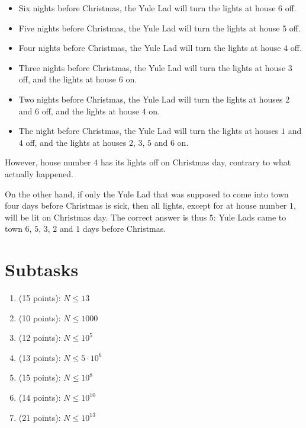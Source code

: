 \begin{itemize}
    \item Six nights before Christmas, the Yule Lad will turn the lights at house $6$ off.
    \item Five nights before Christmas, the Yule Lad will turn the lights at house $5$ off.
    \item Four nights before Christmas, the Yule Lad will turn the lights at house $4$ off.
    \item Three nights before Christmas, the Yule Lad will turn the lights at house $3$ off, and the lights at house $6$ on.
    \item Two nights before Christmas, the Yule Lad will turn the lights at houses $2$ and $6$ off, and the lights at house $4$ on.
    \item The night before Christmas, the Yule Lad will turn the lights at houses $1$ and $4$ off, and the lights at houses $2$, $3$, $5$ and $6$ on.
\end{itemize}

However, house number $4$ has its lights off on Christmas day, contrary to what
actually happened.

On the other hand, if only the Yule Lad that was supposed to come into town
four days before Christmas is sick, then all lights, except for at house number
$1$, will be lit on Christmas day. The correct answer is thus $5$: Yule Lads
came to town $6$, $5$, $3$, $2$ and $1$ days before Christmas.

\section*{Subtasks}

\begin{enumerate}
    \item (15 points): $N \leq 13$
    \item (10 points): $N \leq 1000$
    \item (12 points): $N \leq 10^5$
    \item (13 points): $N \leq 5 \cdot 10^{6}$
    \item (15 points): $N \leq 10^{8}$
    \item (14 points): $N \leq 10^{10}$
    \item (21 points): $N \leq 10^{13}$
\end{enumerate}

